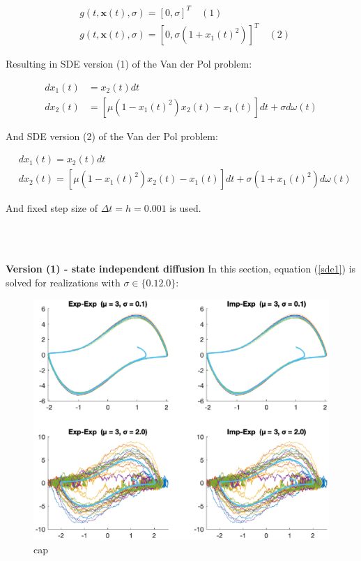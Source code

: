 \begin{align*}
    & g(t, \boldsymbol{x}(t), \sigma) = [0, \sigma]^T \quad (1) \\
    & g(t, \boldsymbol{x}(t), \sigma) = [0, \sigma (1 + x_1(t)^2)]^T \quad (2)
\end{align*}

Resulting in SDE version (1) of the Van der Pol problem:

\begin{equation}
\label{sde1}
\begin{aligned}
d x_{1}(t) &=x_{2}(t) d t \\
d x_{2}(t) &=\left[\mu\left(1-x_{1}(t)^{2}\right) x_{2}(t)-x_{1}(t)\right] d t+\sigma d \omega(t)
\end{aligned}
\end{equation}

And SDE version (2) of the Van der Pol problem:

\begin{equation}
\label{sde1}
\begin{aligned}
&d x_{1}(t)=x_{2}(t) d t \\
&d x_{2}(t)=\left[\mu\left(1-x_{1}(t)^{2}\right) x_{2}(t)-x_{1}(t)\right] d t+\sigma\left(1+x_{1}(t)^{2}\right) d \omega(t)
\end{aligned}
\end{equation}

And fixed step size of $\Delta t = h = 0.001$ is used.







\\\

\textbf{Version (1) - state independent diffusion}
In this section, equation (\ref{sde1}) is solved for realizations with $\sigma \in \{0.1 2.0\}$:

\begin{figure}
    \centering
    \includegraphics[width=\textwidth]{plots/4b.eps}
    \caption{cap}
    \label{fig:4b}
\end{figure}

